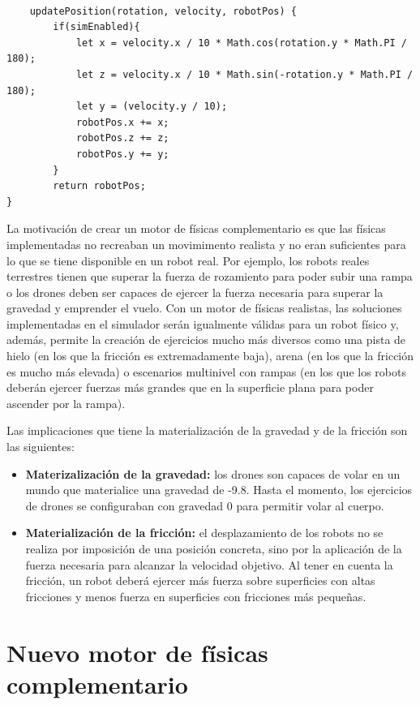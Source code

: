 \small{
\begin{verbatim} 

    updatePosition(rotation, velocity, robotPos) {
        if(simEnabled){
            let x = velocity.x / 10 * Math.cos(rotation.y * Math.PI / 180);
            let z = velocity.x / 10 * Math.sin(-rotation.y * Math.PI / 180);
            let y = (velocity.y / 10);
            robotPos.x += x;
            robotPos.z += z;
            robotPos.y += y;
        }
        return robotPos;
}
\end{verbatim}
}

\normalsize
La motivación de crear un motor de físicas complementario es que las físicas implementadas no recreaban un movimimento realista y no eran suficientes para lo que se tiene disponible en un robot real. Por ejemplo, los robots reales terrestres tienen que superar la fuerza de rozamiento para poder subir una rampa o los drones deben ser capaces de ejercer la fuerza necesaria para superar la gravedad y emprender el vuelo. Con un motor de físicas realistas, las soluciones implementadas en el simulador serán igualmente válidas para un robot físico y, además, permite la creación de ejercicios mucho más diversos como una pista de hielo (en los que la fricción es extremadamente baja), arena (en los que la fricción es mucho más elevada) o escenarios multinivel con rampas (en los que los robots deberán ejercer fuerzas más grandes que en la superficie plana para poder ascender por la rampa). \newline

Las implicaciones que tiene la materialización de la gravedad y de la fricción son las siguientes:

\begin{itemize}
    \item \textbf{Materizalización de la gravedad:} los drones son capaces de volar en un mundo que materialice una gravedad de -9.8. Hasta el momento, los ejercicios de drones se configuraban con gravedad 0 para permitir volar al cuerpo.
    \item \textbf{Materialización de la fricción:} el desplazamiento de los robots no se realiza por imposición de una posición concreta, sino por la aplicación de la fuerza necesaria para alcanzar la velocidad objetivo. Al tener en cuenta la fricción, un robot deberá ejercer más fuerza sobre superficies con altas fricciones y menos fuerza en superficies con fricciones más pequeñas.
\end{itemize}

\section{Nuevo motor de físicas complementario}
